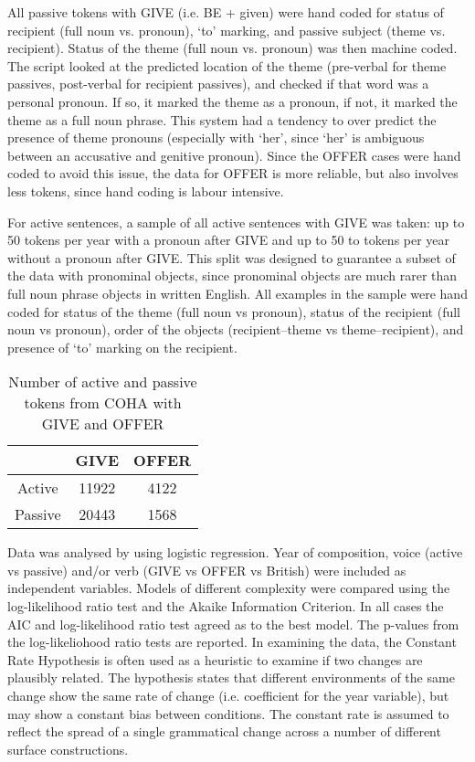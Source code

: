 All passive tokens with GIVE (i.e. BE + given) were hand coded for status of recipient (full noun vs. pronoun), `to' marking, and passive subject (theme vs. recipient). Status of the theme (full noun vs. pronoun) was then machine coded. The script looked at the predicted location of the theme (pre-verbal for theme passives, post-verbal for recipient passives), and checked if that word was a personal pronoun. If so, it marked the theme as a pronoun, if not, it marked the theme as a full noun phrase. This system had a tendency to over predict the presence of theme pronouns (especially with `her', since `her' is ambiguous between an accusative and genitive pronoun). Since the OFFER cases were hand coded to avoid this issue, the data for OFFER is more reliable, but also involves less tokens, since hand coding is labour intensive.

For active sentences, a sample of all active sentences with GIVE was taken: up to 50 tokens per year with a pronoun after GIVE and up to 50 to tokens per year without a pronoun after GIVE. This split was designed to guarantee a subset of the data with pronominal objects, since pronominal objects are much rarer than full noun phrase objects in written English. All examples in the sample were hand coded for status of the theme (full noun vs pronoun), status of the recipient (full noun vs pronoun), order of the objects (recipient--theme vs theme--recipient), and presence of `to' marking on the recipient.

\begin{table}[h!]
\begin{center}
\begin{tabular}{|c|c|c|}
\hline
 & GIVE & OFFER \\
\hline
Active & 11922  & 4122 \\
\hline
Passive & 20443 &  1568 \\
\hline
\end{tabular}
\end{center}
\caption{Number of active and passive tokens from COHA with GIVE and OFFER}
\end{table}

Data was analysed by using logistic regression. Year of composition, voice (active vs passive) and/or verb (GIVE vs OFFER vs British) were included as independent variables. Models of different complexity were compared using the log-likelihood ratio test and the Akaike Information Criterion. In all cases the AIC and log-likelihood ratio test agreed as to the best model. The p-values from the log-likeliohood ratio tests are reported. In examining the data, the Constant Rate Hypothesis \citep{Kroch.1989} is often used as a heuristic to examine if two changes are plausibly related. The hypothesis states that different environments of the same change show the same rate of change (i.e. coefficient for the year variable), but may show a constant bias between conditions. The constant rate is assumed to reflect the spread of a single grammatical change across a number of different surface constructions.

